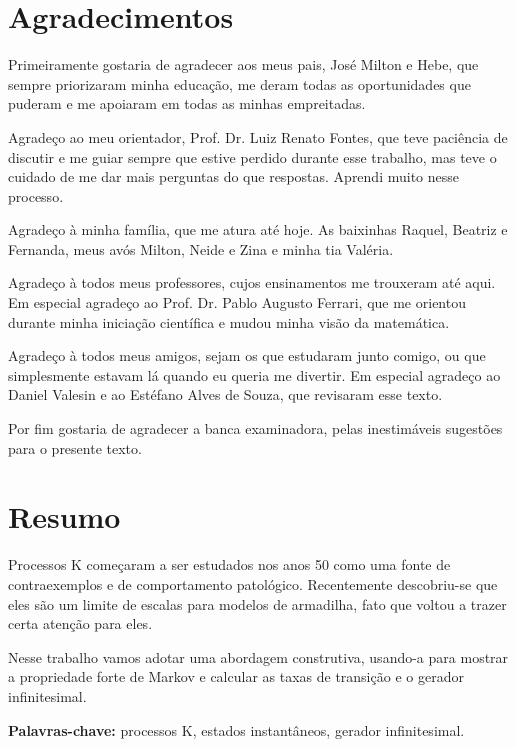 \chapter*{Agradecimentos}

Primeiramente gostaria de agradecer aos meus pais, José Milton e Hebe,
que sempre priorizaram minha educação, me deram todas as oportunidades
que puderam e me apoiaram em todas as minhas empreitadas.

Agradeço ao meu orientador, Prof. Dr. Luiz Renato Fontes, que teve
paciência de discutir e me guiar sempre que estive perdido durante
esse trabalho, mas teve o cuidado de me dar mais perguntas do que
respostas. Aprendi muito nesse processo.

Agradeço à minha família, que me atura até hoje. As baixinhas Raquel,
Beatriz e Fernanda, meus avós Milton, Neide e Zina e minha tia Valéria.

Agradeço à todos meus professores, cujos ensinamentos me trouxeram até
aqui. Em especial agradeço ao Prof. Dr. Pablo Augusto Ferrari, que me
orientou durante minha iniciação científica e mudou minha visão da
matemática.

Agradeço à todos meus amigos, sejam os que estudaram junto comigo, ou
que simplesmente estavam lá quando eu queria me divertir. Em especial
agradeço ao Daniel Valesin e ao Estéfano Alves de Souza, que revisaram
esse texto.

Por fim gostaria de agradecer a banca examinadora, pelas inestimáveis
sugestões para o presente texto.

\chapter*{Resumo}

Processos K começaram a ser estudados nos anos 50 como uma fonte de
contraexemplos e de comportamento patológico. Recentemente
descobriu-se que eles são um limite de escalas para modelos de
armadilha, fato que voltou a trazer certa atenção para eles.

Nesse trabalho vamos adotar uma abordagem construtiva, usando-a para
mostrar a propriedade forte de Markov e calcular as taxas de transição
e o gerador infinitesimal.

\noindent \textbf{Palavras-chave:} processos K, estados instantâneos,
gerador infinitesimal.

